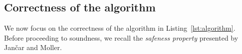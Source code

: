 %
%
%

\subsection{Correctness of the algorithm}

We now focus on the correctness of the algorithm in
Listing~\ref{lst:algorithm}.  Before proceeding to soundness, we
recall the \emph{safeness property} presented by Jan{\v{c}}ar and
Moller.

